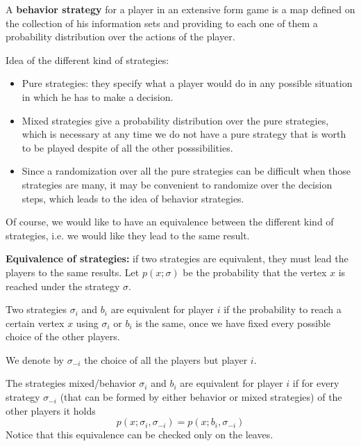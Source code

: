 
%


\noindent A \textbf{behavior strategy} for a player in an extensive form game 
is a map defined on the collection of his information sets and providing 
to each one of them a probability distribution over the actions of the player.

\bigskip
\noindent Idea of the different kind of strategies:
\begin{itemize}
	\item Pure strategies: they specify what a player would do in any possible 
	situation in which he has to make a decision.
	\item Mixed strategies give a probability distribution over the pure 
	strategies, which is necessary at any time we do not have a pure strategy 
	that is worth to be played despite of all the other posssibilities.
	\item Since a randomization over all the pure strategies can be difficult 
	when those strategies are many, it may be convenient to randomize over the 
	decision steps, which leads to the idea of behavior strategies.
\end{itemize}
Of course, we would like to have an equivalence between the different kind of 
strategies, i.e. we would like they lead to the same result.

\bigskip
\noindent \textbf{Equivalence of strategies:} if two strategies are equivalent, 
they must lead the players to the same results. Let $p(x; \sigma)$ be the 
probability that the vertex $x$ is reached under the strategy $\sigma$. 

\noindent Two strategies $\sigma_i$ and $b_i$ are equivalent for player $i$ if 
the probability to reach a certain vertex $x$ using $\sigma_i$ or $b_i$ is 
the same, once we have fixed every possible choice of the other players.

\noindent We denote by $\sigma_{-i}$ the choice of all the players but player 
$i$.  

\noindent The strategies mixed/behavior $\sigma_i$ and $b_i$ are equivalent for 
player $i$ if for every strategy $\sigma_{-i}$ (that can be formed by either 
behavior or mixed strategies) of the other players it holds
\[
	p(x; \sigma_i, \sigma_{-i}) = p(x; b_i, \sigma_{-i})
\]
Notice that this equivalence can be checked only on the leaves.

